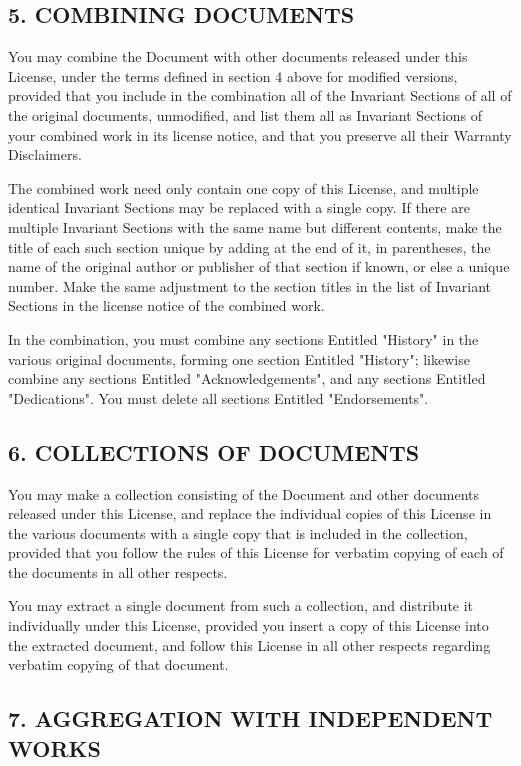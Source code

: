 \subsection*{5. COMBINING DOCUMENTS}

You may combine the Document with other documents released under this License, under the terms defined in section 4 above for modified versions, provided 
that you include in the combination all of the Invariant Sections of all of the original documents, unmodified, and list them all as Invariant Sections of 
your combined work in its license notice, and that you preserve all their Warranty Disclaimers.

The combined work need only contain one copy of this License, and multiple identical Invariant Sections may be replaced with a single copy. If there are 
multiple Invariant Sections with the same name but different contents, make the title of each such section unique by adding at the end of it, in parentheses, 
the name of the original author or publisher of that section if known, or else a unique number. Make the same adjustment to the section titles in the list of 
Invariant Sections in the license notice of the combined work.

In the combination, you must combine any sections Entitled "History" in the various original documents, forming one section Entitled "History"; likewise 
combine any sections Entitled "Acknowledgements", and any sections Entitled "Dedications". You must delete all sections Entitled "Endorsements".


\subsection*{6. COLLECTIONS OF DOCUMENTS}

You may make a collection consisting of the Document and other documents released under this License, and replace the individual copies of this License in the various documents with 
a single copy that is included in the collection, provided that you follow the rules of this License for verbatim copying of each of the documents in all other respects.

You may extract a single document from such a collection, and distribute it individually under this License, provided you insert a copy of this License into the 
extracted document, and follow this License in all other respects regarding verbatim copying of that document.


\subsection*{7. AGGREGATION WITH INDEPENDENT WORKS}

